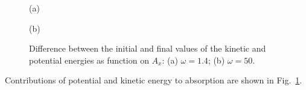 \begin{figure}[h!]
\begin{minipage}[h]{0.5\linewidth}
 (a) \\
\end{minipage}
\hfill
\begin{minipage}[h]{0.5\linewidth}
 (b) \\
\end{minipage}
\caption{Difference between the initial and final values of the kinetic and potential energies as function on $A_x$: (a) $\omega=1.4$; (b) $\omega=50$.}
\label{fig:dEpot_A_FS}
\end{figure}

Contributions of potential and kinetic energy to absorption are shown in Fig.~\ref{fig:dEpot_A_FS}.